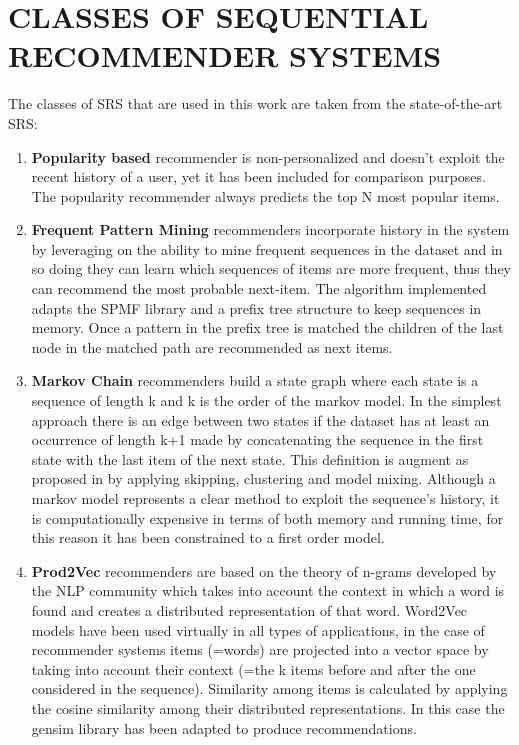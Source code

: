 \documentclass[prodmode,acmtecs]{acmsmall} %
\begin{document}
\section{CLASSES OF SEQUENTIAL RECOMMENDER SYSTEMS}
The classes of SRS that are used in this work are taken from the state-of-the-art SRS:
\begin{enumerate}
	\item \textbf{Popularity based} recommender is non-personalized and doesn't exploit the recent history of a user, yet it has been included for comparison purposes. The popularity recommender always predicts the top N most popular items.
	\item \textbf{Frequent Pattern Mining}\cite{mobasher02sequential} recommenders incorporate history in the system by leveraging on the ability to mine frequent sequences in the dataset and in so doing they can learn which sequences of items are more frequent, thus they can recommend the most probable next-item. The algorithm implemented adapts the SPMF library\cite{fournier2016spmf} and a prefix tree structure to keep sequences in memory. Once a pattern in the prefix tree is matched the children of the last node in the matched path are recommended as next items.
	\item \textbf{Markov Chain} recommenders \cite{shani05mdp} build a state graph where each state is a sequence of length k and k is the order of the markov model. In the simplest approach there is an edge between two states if the dataset has at least an occurrence of length k+1 made by concatenating the sequence in the first state with the last item of the next state. This definition is augment as proposed in \cite{shani05mdp} by applying skipping, clustering and model mixing. Although a markov model represents a clear method to exploit the sequence's history, it is computationally expensive in terms of both memory and running time, for this reason it has been constrained to a first order model. 
	\item \textbf{Prod2Vec} recommenders\cite{grbovic15prod2vec} are based on the theory of n-grams developed by the NLP community which takes into account the context in which a word is found and creates a distributed representation of that word. Word2Vec models have been used virtually in all types of applications\cite{any2vec}, in the case of recommender systems items (=words) are projected into a vector space by taking into account their context (=the k items before and after the one considered in the sequence). Similarity among items is calculated by applying the cosine similarity among their distributed representations. In this case the gensim\cite{rehurek2010software} library has been adapted to produce recommendations.

\end{enumerate}
\end{document}
